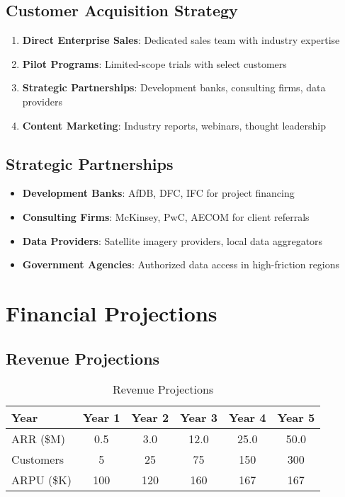 \documentclass[business]{../templates/infraradar-main}
\begin{document}
\subsection{Customer Acquisition Strategy}
\begin{enumerate}
    \item \textbf{Direct Enterprise Sales}: Dedicated sales team with industry expertise
    \item \textbf{Pilot Programs}: Limited-scope trials with select customers
    \item \textbf{Strategic Partnerships}: Development banks, consulting firms, data providers
    \item \textbf{Content Marketing}: Industry reports, webinars, thought leadership
\end{enumerate}

\subsection{Strategic Partnerships}
\begin{itemize}
    \item \textbf{Development Banks}: AfDB, DFC, IFC for project financing
    \item \textbf{Consulting Firms}: McKinsey, PwC, AECOM for client referrals
    \item \textbf{Data Providers}: Satellite imagery providers, local data aggregators
    \item \textbf{Government Agencies}: Authorized data access in high-friction regions
\end{itemize}

\section{Financial Projections}

\subsection{Revenue Projections}
\begin{table}[h]
\centering
\begin{tabular}{|l|c|c|c|c|c|}
\hline
\textbf{Year} & \textbf{Year 1} & \textbf{Year 2} & \textbf{Year 3} & \textbf{Year 4} & \textbf{Year 5} \\
\hline
ARR (\$M) & 0.5 & 3.0 & 12.0 & 25.0 & 50.0 \\
\hline
Customers & 5 & 25 & 75 & 150 & 300 \\
\hline
ARPU (\$K) & 100 & 120 & 160 & 167 & 167 \\
\hline
\end{tabular}
\caption{Revenue Projections}
\end{table}
\end{document}
